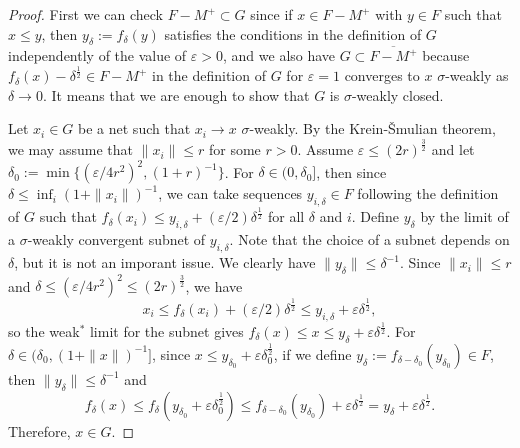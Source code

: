 \documentclass[noamsfonts,a4paper,10pt]{amsart}
\theoremstyle{plain}
\theoremstyle{definition}
\theoremstyle{remark}
\begin{document}
\begin{proof}
First we can check $F-M^+\subset G$ since if $x\in F-M^+$ with $y\in F$ such that $x\le y$, then $y_\delta:=f_\delta(y)$ satisfies the conditions in the definition of $G$ independently of the value of $\varepsilon>0$, and we also have $G\subset\overline{F-M^+}$ because $f_\delta(x)-\delta^{\frac12}\in F-M^+$ in the definition of $G$ for $\varepsilon=1$ converges to $x$ $\sigma$-weakly as $\delta\to0$.
It means that we are enough to show that $G$ is $\sigma$-weakly closed.

Let $x_i\in G$ be a net such that $x_i\to x$ $\sigma$-weakly.
By the Krein-\v Smulian theorem, we may assume that $\|x_i\|\le r$ for some $r>0$.
Assume $\varepsilon\le(2r)^{\frac32}$ and let $\delta_0:=\min\{(\varepsilon/4r^2)^2,(1+r)^{-1}\}$.
For $\delta\in(0,\delta_0]$, then since $\delta\le\inf_i(1+\|x_i\|)^{-1}$, we can take sequences $y_{i,\delta}\in F$ following the definition of $G$ such that $f_\delta(x_i)\le y_{i,\delta}+(\varepsilon/2)\delta^{\frac12}$ for all $\delta$ and $i$.
Define $y_\delta$ by the limit of a $\sigma$-weakly convergent subnet of $y_{i,\delta}$.
Note that the choice of a subnet depends on $\delta$, but it is not an imporant issue.
We clearly have $\|y_\delta\|\le\delta^{-1}$.
Since $\|x_i\|\le r$ and $\delta\le(\varepsilon/4r^2)^2\le(2r)^{\frac32}$, we have
\[x_i\le f_\delta(x_i)+(\varepsilon/2)\delta^{\frac12}\le y_{i,\delta}+\varepsilon\delta^{\frac12},\]
so the weak$^*$ limit for the subnet gives $f_\delta(x)\le x\le y_\delta+\varepsilon\delta^{\frac12}$.
For $\delta\in(\delta_0,(1+\|x\|)^{-1}]$, since $x\le y_{\delta_0}+\varepsilon\delta_0^{\frac12}$, if we define $y_\delta:=f_{\delta-\delta_0}(y_{\delta_0})\in F$, then $\|y_\delta\|\le\delta^{-1}$ and
\[f_{\delta}(x)\le f_\delta(y_{\delta_0}+\varepsilon\delta_0^{\frac12})\le f_{\delta-\delta_0}(y_{\delta_0})+\varepsilon\delta^{\frac12}=y_\delta+\varepsilon\delta^{\frac12}.\]
Therefore, $x\in G$.
\end{proof}
\end{document}
